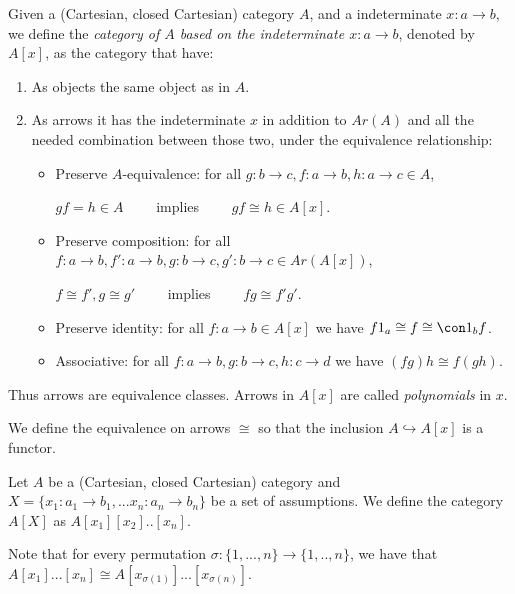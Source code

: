 \begin{definition}\cite[Part I, Chapter 5]{lambek1988introduction}
  Given a (Cartesian, closed Cartesian) category $A$, and a indeterminate $x: a \to b$, we define the \emph{category of $A$ based on the indeterminate $x:a\to b$}, denoted by $A[x]$, as the category that have:
  \begin{enumerate}
  \item As objects the same object as in $A$.
  \item As arrows it has the indeterminate $x$ in addition to $Ar(A)$ and all the needed combination between those two, under the equivalence relationship:
    \begin{itemize}
    \item Preserve   $A$-equivalence: for all $g:b\to c,f:a\to b, h: a\to c\in A$,
      \begin{center}
        $gf=h \in A\qquad $ implies $\qquad gf \cong h\in A[x].$
      \end{center}

    \item Preserve composition: for all $f:a\to b,f':a\to b,g:b\to c,g': b \to c\in Ar(A[x])$,
      \begin{center}
        $f\cong f', g\cong g'\qquad$ implies $\qquad fg\cong f'g'$.
      \end{center}
      
    \item Preserve identity: for all $f:a\to b\in A[x]$ we have $f1_a\cong f \cong \con 1_bf$.
    \item Associative: for all $f:a\to b, g:b\to c, h: c\to d$ we have $(fg)h\cong f(gh)$.
    \end{itemize}
  \end{enumerate}
  Thus arrows are equivalence classes. Arrows in $A[x]$ are called \emph{polynomials} in $x$.
\end{definition}
\begin{remark}
  We define the equivalence on arrows $\cong$ so that the inclusion $A\hookrightarrow A[x]$ is a functor.
\end{remark}
\begin{definition}
Let $A$ be a (Cartesian, closed Cartesian) category and $X=\{x_1:a_1 \to b_1, ... x_n:a_n \to b_n\}$ be a set of assumptions. We define the category $A[X]$ as $A[x_1][x_2]..[x_n]$.
\end{definition}
\begin{remark}
Note that for every permutation $\sigma : \{1,...,n\}\to \{1,..,n\}$, we have that $A[x_1]...[x_n]\cong A[x_{\sigma(1)}]...[x_{\sigma(n)}]$. 
\end{remark}


